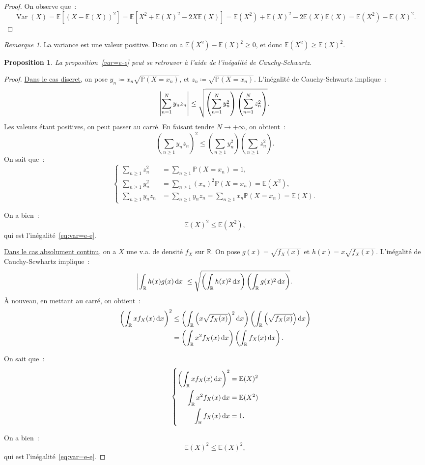 \documentclass{article}
\newcommand{\E}{\mathbb E}
\renewcommand{\P}{\mathbb P}
\newcommand{\R}{\mathbb R}
\DeclareMathOperator{\Var}{Var}
\newtheorem{prp}[thm]{Proposition}
\theoremstyle{definition}
\theoremstyle{remark}
\newtheorem*{rmq}{Remarque}
\begin{document}
		\begin{proof} On observe que~:
		\[\Var(X) = \E\left[(X-\E(X))^2\right] = \E\left[X^2 + \E(X)^2 - 2X\E(X)\right] = \E(X^2) + \E(X)^2 - 2\E(X)\E(X) = \E(X^2) - \E(X)^2.\]
		\end{proof}

		\begin{rmq} La variance est une valeur positive. Donc on a $\E(X^2) - \E(X)^2 \geq 0$, et donc $\E(X^2) \geq \E(X)^2$. \end{rmq}

		\begin{prp} La proposition~\ref{var=e-e} peut se retrouver à l'aide de l'inégalité de Cauchy-Schwartz. \end{prp}

		\begin{proof} \underline{Dans le cas discret}, on pose $y_n \coloneqq x_n\sqrt{\P(X=x_n)}$, et $z_n \coloneqq \sqrt{\P(X=x_n)}$. L'inégalité de
		Cauchy-Schwartz implique~:
		\[\abs {\sum_{n=1}^Ny_nz_n} \leq \sqrt{\left(\sum_{n=1}^Ny_n^2\right) \left(\sum_{n=1}^Nz_n^2\right)}.\]
		Les valeurs étant positives, on peut passer au carré. En faisant tendre $N \to +\infty$, on obtient~:
		\[\left(\sum_{n \geq 1}y_nz_n\right)^2 \leq \left(\sum_{n \geq 1}y_n^2\right) \left(\sum_{n \geq 1}z_n^2\right).\]
		On sait que~:
		\[
			\left\{\begin{aligned}
				\sum_{n \geq 1}z_n^2 &= \sum_{n \geq 1}\P(X = x_n) = 1, \\
				\sum_{n \geq 1}y_n^2 &= \sum_{n \geq 1}(x_n)^2\P(X = x_n) = \E(X^2), \\
				\sum_{n \geq 1}y_nz_n &= \sum_{n \geq 1}y_nz_n = \sum_{n \geq 1}x_n\P(X = x_n) = \E(X).
			\end{aligned}\right.
		\]

		On a bien~:
		\[\E(X)^2 \leq \E(X^2),\]
		qui est l'inégalité~\eqref{eq:var=e-e}.

		\underline{Dans le cas absolument continu}, on a $X$ une v.a. de densité $f_X$ sur $\R$. On pose $g(x) = \sqrt{f_X(x)}$ et $h(x) = x\sqrt{f_X(x)}$.
		L'inégalité de Cauchy-Scwhartz implique~:
		\[\abs{\int_\R h(x)g(x)\dif x} \leq \sqrt {\left(\int_\R h(x)^2 \dif x\right) \left(\int_\R g(x)^2 \dif x\right)}.\]
		À nouveau, en mettant au carré, on obtient~:
		\begin{align*}
			\left(\int_\R xf_X(x)\dif x\right)^2 &\leq \left(\int_\R \left(x\sqrt{f_X(x)}\right)^2\dif x\right) \left(\int_\R\left(\sqrt{f_X(x)}\right)\dif x\right) \\
			&= \left(\int_\R x^2f_X(x)\dif x\right) \left(\int_\R f_X(x)\dif x\right).
		\end{align*}

		On sait que~:
		\[
			\left\{\begin{aligned}
				\left(\int_\R xf_X(x)\dif x\right)^2 &= \E(X)^2 \\
				\int_\R x^2f_X(x)\dif x &= \E(X^2) \\
				\int_\R f_X(x)\dif x &= 1.
			\end{aligned}\right.
		\]

		On a bien~:
		\[\E(X)^2 \leq \E(X)^2,\]
		qui est l'inégalité~\eqref{eq:var=e-e}.
		\end{proof}
\end{document}
